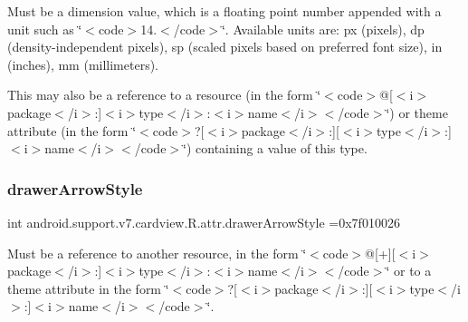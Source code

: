 Must be a dimension value, which is a floating point number appended with a unit such as \char`\"{}$<$code$>$14.\+5sp$<$/code$>$\char`\"{}. Available units are\+: px (pixels), dp (density-\/independent pixels), sp (scaled pixels based on preferred font size), in (inches), mm (millimeters). 

This may also be a reference to a resource (in the form \char`\"{}$<$code$>$@\mbox{[}$<$i$>$package$<$/i$>$\+:\mbox{]}$<$i$>$type$<$/i$>$\+:$<$i$>$name$<$/i$>$$<$/code$>$\char`\"{}) or theme attribute (in the form \char`\"{}$<$code$>$?\mbox{[}$<$i$>$package$<$/i$>$\+:\mbox{]}\mbox{[}$<$i$>$type$<$/i$>$\+:\mbox{]}$<$i$>$name$<$/i$>$$<$/code$>$\char`\"{}) containing a value of this type. \mbox{\label{classandroid_1_1support_1_1v7_1_1cardview_1_1R_1_1attr_a8b6ae72db99da4bb6ed4abcd3bcf11bd}} 
\subsubsection{\texorpdfstring{drawer\+Arrow\+Style}{drawerArrowStyle}}
{\footnotesize\ttfamily int android.\+support.\+v7.\+cardview.\+R.\+attr.\+drawer\+Arrow\+Style =0x7f010026\hspace{0.3cm}{\ttfamily [static]}}

Must be a reference to another resource, in the form \char`\"{}$<$code$>$@\mbox{[}+\mbox{]}\mbox{[}$<$i$>$package$<$/i$>$\+:\mbox{]}$<$i$>$type$<$/i$>$\+:$<$i$>$name$<$/i$>$$<$/code$>$\char`\"{} or to a theme attribute in the form \char`\"{}$<$code$>$?\mbox{[}$<$i$>$package$<$/i$>$\+:\mbox{]}\mbox{[}$<$i$>$type$<$/i$>$\+:\mbox{]}$<$i$>$name$<$/i$>$$<$/code$>$\char`\"{}. \mbox{\label{classandroid_1_1support_1_1v7_1_1cardview_1_1R_1_1attr_abd1874e372581dedbc2529cb02c57d06}} 
